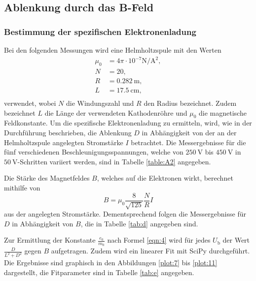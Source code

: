 \clearpage
\subsection{Ablenkung durch das B-Feld}
\subsubsection{Bestimmung der spezifischen Elektronenladung}
Bei den folgenden Messungen wird eine Helmholtzspule mit den Werten
\begin{align*}
  \mu_0 &= 4\pi \cdot 10^{-7}\si{\newton\per\ampere\tothe{2}},\\
  N    &= 20,\\
  R    &= \SI{0,282}{\metre} ,\\
  L    &= \SI{17,5}{\centi\metre} ,\\
\end{align*}
verwendet, wobei $N$ die Windungszahl und $R$ den Radius bezeichnet.
Zudem bezeichnet $L$ die Länge der verwendeten Kathodenröhre \cite{skript1} und $\mu_0$ die magnetische Feldkonstante.
Um die spezifische Elektronenladung zu ermitteln, wird, wie in der Durchführung beschrieben, die Ablenkung $D$ in Abhängigkeit von der an der Helmholtzspule angelegten Stromstärke $I$ betrachtet.
Die Messergebnisse für die fünf verschiedenen Beschleunigungsspannungen, welche von $\SI{250}{\volt}$ bis $\SI{450}{\volt}$ in $\SI{50}{\volt}$-Schritten variiert werden, sind in Tabelle \ref{table:A2} angegeben.



Die Stärke des Magnetfeldes $B$, welches auf die Elektronen wirkt, berechnet mithilfe von
\begin{equation}
  B = \mu_0 \frac{8}{\sqrt{125}}\frac{N}{R} I
  \label{eqn:bfeld}
\end{equation}
aus der angelegten Stromstärke.
Dementsprechend folgen die Messergebnisse für $D$ in Abhängigkeit von $B$, die in Tabelle \ref{tab:d} angegeben sind.



Zur Ermittlung der Konstante $\frac{e_0}{m_0}$ nach Formel \eqref{eqn:4} wird für jedes $U_\text{b}$ der Wert $\frac{D}{L^2+D^2}$ gegen $B$ aufgetragen.
Zudem wird ein linearer Fit mit SciPy durchgeführt.
Die Ergebnisse sind graphisch in den Abbildungen \ref{plot:7} bis \ref{plot:11} dargestellt, die Fitparameter sind in Tabelle \ref{tab:e} angegeben.



